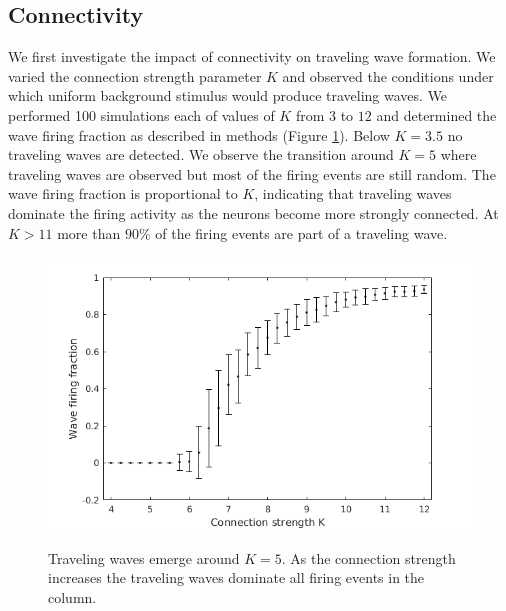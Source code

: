 \documentclass[a4paper,11pt]{article}
\begin{document}
\subsection{Connectivity} \label{sub:connectivity}
We first investigate the impact of connectivity on traveling wave formation.
We varied the connection strength parameter $K$ and observed the conditions under which uniform background stimulus would produce traveling waves.
We performed 100 simulations each of values of $K$ from $3$ to $12$ and determined the wave firing fraction as described in methods (Figure \ref{fig:conn_fraction}).
Below $K=3.5$ no traveling waves are detected.
We observe the transition around $K=5$ where traveling waves are observed but most of the firing events are still random.
The wave firing fraction is proportional to $K$, indicating that traveling waves dominate the firing activity as the neurons become more strongly connected.
At $K>11$ more than $90\%$ of the firing events are part of a traveling wave.
\begin{figure}[!ht]
 \caption{Traveling waves emerge around $K=5$. As the connection strength increases the traveling waves dominate all firing events in the column.}
 \centering
   \includegraphics[width=\textwidth]{fig/ConnectionStrengthWaveFraction}  
 \label{fig:conn_fraction}
\end{figure}
\end{document}
